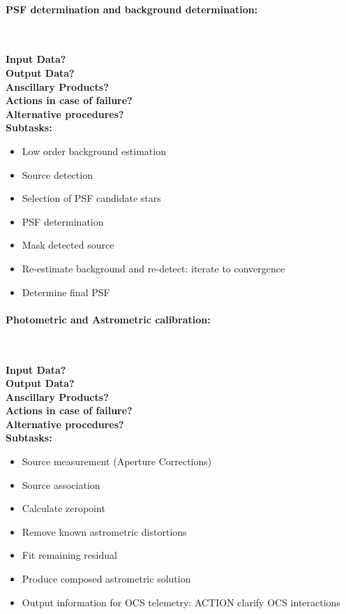 \paragraph{PSF determination and background determination:}~

\noindent
{\bf Input Data?}\\
{\bf Output Data?}\\
{\bf Anscillary Products?}\\
{\bf Actions in case of failure?}\\
{\bf Alternative procedures?}\\

\noindent
{\bf Subtasks:}
\begin{itemize}
\item Low order background estimation
\item Source detection
\item Selection of PSF candidate stars
\item PSF determination
\item Mask detected source
\item Re-estimate background and re-detect: iterate to convergence
\item Determine final PSF
\end{itemize}


\paragraph{Photometric and Astrometric calibration:}~

\noindent
{\bf Input Data?}\\
{\bf Output Data?}\\
{\bf Anscillary Products?}\\
{\bf Actions in case of failure?}\\
{\bf Alternative procedures?}\\

\noindent
{\bf Subtasks:}
\begin{itemize}
\item Source measurement (Aperture Corrections)
\item Source association
\item Calculate zeropoint
\item Remove known astrometric distortions
\item Fit remaining residual
\item Produce composed astrometric solution
\item Output information for OCS telemetry: ACTION clarify OCS interactions
\end{itemize}

